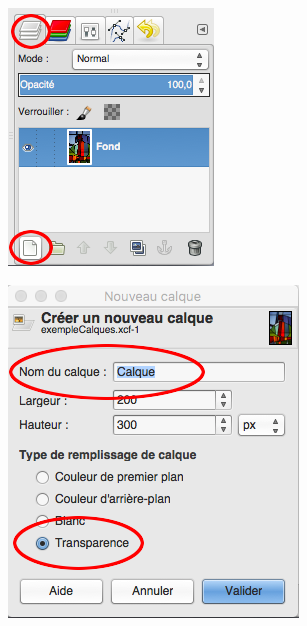 \begin{minipage}[c]{.32\textwidth}
\centering%
\includegraphics[angle=0,width=.85\textwidth]{./images/image02/GimpCalqueAjouter1}
\end{minipage}\hfill%
\begin{minipage}[c]{.32\textwidth}
\centering%
\includegraphics[angle=0,width=.85\textwidth]{./images/image02/GimpCalqueAjouter2}
\end{minipage}\hfill%
